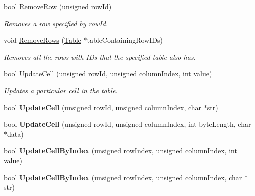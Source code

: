 \begin{DoxyCompactItemize}
\item 
bool \hyperlink{class_data_structures_1_1_table_a077db0ae39434486f93d652fdd7b8dcc}{Remove\-Row} (unsigned row\-Id)
\begin{DoxyCompactList}\small\item\em Removes a row specified by row\-Id. \end{DoxyCompactList}\item 
void \hyperlink{class_data_structures_1_1_table_adfdf8f33215a3ef5e990350c429fe902}{Remove\-Rows} (\hyperlink{class_data_structures_1_1_table}{Table} $\ast$table\-Containing\-Row\-I\-Ds)
\begin{DoxyCompactList}\small\item\em Removes all the rows with I\-Ds that the specified table also has. \end{DoxyCompactList}\item 
bool \hyperlink{class_data_structures_1_1_table_a0a4b90bc65f1673e8af54b2d190cb35b}{Update\-Cell} (unsigned row\-Id, unsigned column\-Index, int value)
\begin{DoxyCompactList}\small\item\em Updates a particular cell in the table. \end{DoxyCompactList}\item 
\hypertarget{class_data_structures_1_1_table_a87a6deddccfc23ee94a857a1fbc16953}{bool {\bfseries Update\-Cell} (unsigned row\-Id, unsigned column\-Index, char $\ast$str)}\label{class_data_structures_1_1_table_a87a6deddccfc23ee94a857a1fbc16953}

\item 
\hypertarget{class_data_structures_1_1_table_a3d0dfbb6210805d0110d36b4ed1f21c6}{bool {\bfseries Update\-Cell} (unsigned row\-Id, unsigned column\-Index, int byte\-Length, char $\ast$data)}\label{class_data_structures_1_1_table_a3d0dfbb6210805d0110d36b4ed1f21c6}

\item 
\hypertarget{class_data_structures_1_1_table_a67da867999a061416dfbbdf1e3ecba15}{bool {\bfseries Update\-Cell\-By\-Index} (unsigned row\-Index, unsigned column\-Index, int value)}\label{class_data_structures_1_1_table_a67da867999a061416dfbbdf1e3ecba15}

\item 
\hypertarget{class_data_structures_1_1_table_acb5701ac8704d7faa28bb189244690f3}{bool {\bfseries Update\-Cell\-By\-Index} (unsigned row\-Index, unsigned column\-Index, char $\ast$str)}\label{class_data_structures_1_1_table_acb5701ac8704d7faa28bb189244690f3}


\end{DoxyCompactItemize}
